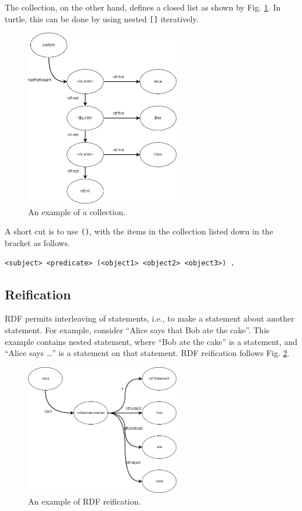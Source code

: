 The collection, on the other hand, defines a closed list as shown by Fig. \ref{fig:lectureexp4}. In turtle, this can be done by using nested \verb|[]| iteratively.
\begin{figure}[htbp]
	\centering
	\includegraphics[width=0.6\textwidth]{./chapters/ch-semanticwebarchitecture/figures/lectureexp4.png}
	\caption{An example of a collection.}
	\label{fig:lectureexp4}
\end{figure}
A short cut is to use \verb|()|, with the items in the collection listed down in the bracket as follows.
\begin{lstlisting}
<subject> <predicate> (<object1> <object2> <object3>) .
\end{lstlisting}

\subsection{Reification}

RDF permits interleaving of statements, i.e., to make a statement about another statement. For example, consider ``Alice says that Bob ate the cake''. This example contains nested statement, where ``Bob ate the cake'' is a statement, and ``Alice says \ldots'' is a statement on that statement. RDF reification follows Fig. \ref{fig:reificationexp}.
\begin{figure}[htbp]
	\centering
	\includegraphics[width=0.6\textwidth]{./chapters/ch-semanticwebarchitecture/figures/reificationexp.png}
	\caption{An example of RDF reification.}
	\label{fig:reificationexp}
\end{figure}


